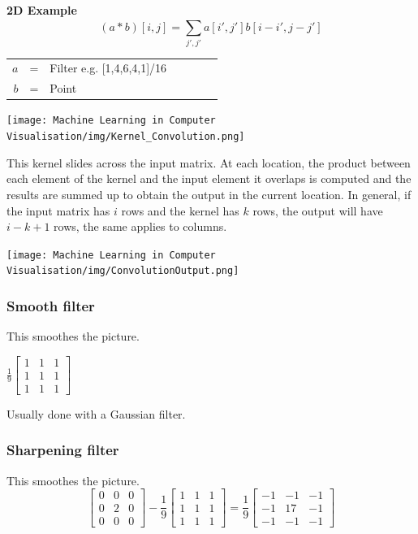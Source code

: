 \documentclass[x11names,11pt,a4paper]{article}
\theoremstyle{definition}
\begin{document}
\textbf{2D Example}
\begin{equation}
     (a\ast b)[i,j] = \sum_{j',j'}^{} a[i',j']b[i-i',j-j'] 
\end{equation}

 \begin{center}\begin{tabular}{rclcrcl}
   $a$ & = & Filter e.g.  [1,4,6,4,1]/16\\ 
   $b$ & = & Point \\
\end{tabular}\end{center}


\begin{center}
	\texttt{[image: Machine Learning in Computer Visualisation/img/Kernel\_Convolution.png]}
\end{center}
This kernel slides across the input matrix. At each location, the product between each element of the kernel and the input element it overlaps is computed and the results are summed up to obtain the output in the current location. In general, if the input matrix has  $i$ rows and the kernel has $k$ rows, the output will have $i-k+1$ rows, the same applies to columns.
\begin{center}
	\texttt{[image: Machine Learning in Computer Visualisation/img/ConvolutionOutput.png]}
\end{center}


\subsubsection{Smooth filter}
This smoothes the picture.
\begin{center}
    $ \frac{1}{9}\begin{bmatrix}
    1 & 1 & 1 \\
    1 & 1 & 1 \\
    1 & 1 & 1 
    \end{bmatrix}  $
\end{center}
Usually done with a Gaussian filter.


\subsubsection{Sharpening filter}
This smoothes the picture.
\begin{equation}
\begin{bmatrix}
    0 & 0 & 0 \\
    0 & 2 & 0 \\
    0 & 0 & 0 
    \end{bmatrix} 
    -
    \frac{1}{9}\begin{bmatrix}
    1 & 1 & 1 \\
    1 & 1 & 1 \\
    1 & 1 & 1 
    \end{bmatrix}
    =
    \frac{1}{9}\begin{bmatrix}
    -1 & -1 & -1 \\
    -1 & 17 & -1 \\
    -1 & -1 & -1 
    \end{bmatrix}
\end{equation}
\end{document}
